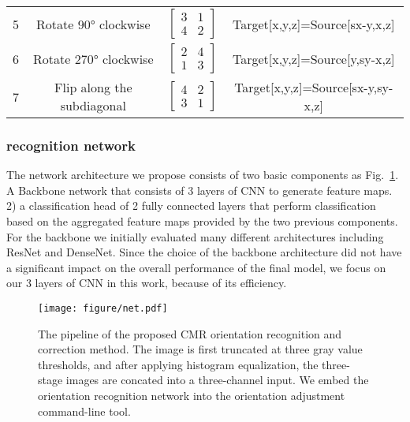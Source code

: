 \documentclass[runningheads]{llncs}
\begin{document}
\begin{table}[htbp]
\begin{tabular}{cp{9.335em}cc}
    5     & \multicolumn{1}{c}{Rotate 90° clockwise} & $\begin{bmatrix} 3 & 1 \\ 4 & 2 \end{bmatrix}$  & Target[x,y,z]=Source[sx-y,x,z] \\
    6     & \multicolumn{1}{c}{Rotate 270° clockwise} & $\begin{bmatrix} 2 & 4 \\ 1 & 3 \end{bmatrix}$  & Target[x,y,z]=Source[y,sy-x,z] \\
    7     & \multicolumn{1}{c}{Flip along the subdiagonal} & $\begin{bmatrix} 4 & 2 \\ 3 & 1 \end{bmatrix}$  & Target[x,y,z]=Source[sx-y,sy-x,z] \\
    \bottomrule
    \end{tabular}%
  \label{tab:addlabel}%
\end{table}%


\subsubsection{recognition network}
The network architecture we propose consists of two basic components as Fig.~\ref{net}. A Backbone network that consists of 3 layers of CNN to generate feature maps. 2) a classification head of 2 fully connected layers that perform classification based on the aggregated feature maps provided by the two previous components. For the backbone we initially evaluated many different architectures including ResNet\cite{resnet} and DenseNet\cite{dense}. Since the choice of the backbone architecture did not have a significant impact on the overall performance of the final model, we focus on our 3 layers of CNN in this work, because of its efficiency.



\begin{figure}
\texttt{[image: figure/net.pdf]}
\caption{The pipeline of the proposed CMR orientation recognition and correction method. The image is first truncated at three gray value thresholds, and after applying histogram equalization, the three-stage images are concated into a three-channel input. We embed the orientation recognition network into the orientation adjustment command-line tool.} \label{net}
\end{figure}
\end{document}
